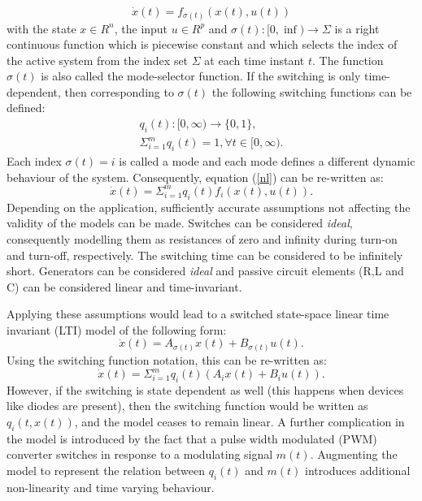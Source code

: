 \documentclass[preprint,12pt]{elsarticle}
\begin{document}
\begin{equation} \label{nl}
\dot{x}(t) = f_{\sigma(t)}(x(t),u(t))
\end{equation}
with the state $x \in R^n$, the input $u \in R^p$ and $\sigma(t) : [0,\inf) \rightarrow \Sigma$ is a right continuous function which is piecewise constant and which selects the index of the active system from the index set $\Sigma$ at each time instant $t$. The function $\sigma(t)$ is also called the mode-selector function. If the switching is only time-dependent, then corresponding to $\sigma(t)$ the following switching functions can be defined:
\begin{eqnarray}
q_i(t) : [0,\infty) \rightarrow \{0, 1\},\\
\Sigma_{i=1}^{m}q_i(t) = 1, \forall t \in [0,\infty).
\end{eqnarray}
Each index $\sigma(t)=i$ is called a mode and each mode defines a different dynamic behaviour of the system. Consequently, equation (\ref{nl}) can be re-written as:
\begin{equation}
\dot{x}(t) = \Sigma_{i=1}^{m}q_i(t)f_i(x(t),u(t)).
\end{equation}
Depending on the application, sufficiently accurate assumptions not affecting the validity of the models can be made. Switches can be considered \textit{ideal}, consequently modelling them as resistances of zero and infinity during turn-on and turn-off, respectively. The switching time can be considered to be infinitely short. Generators can be considered \textit{ideal} and passive circuit elements (R,L and C) can be considered linear and time-invariant.

Applying these assumptions would lead to a switched state-space linear time invariant (LTI) model of the following form:
\begin{equation}
\dot{x}(t) = A_{\sigma(t)}x(t)+B_{\sigma(t)}u(t).
\end{equation}
Using the switching function notation, this can be re-written as:
\begin{equation}
\dot{x}(t) = \Sigma_{i=1}^{m}q_i(t)(A_ix(t)+B_iu(t)).
\end{equation}
However, if the switching is state dependent as well (this happens when devices like diodes are present), then the switching function would be written as $q_i(t, x(t))$, and the model ceases to remain linear. A further complication in the model
is introduced by the fact that a pulse width modulated (PWM) converter switches in response to a modulating signal $m(t)$. Augmenting the model to represent the relation between $q_i(t)$
and $m(t)$ introduces additional non-linearity and time varying behaviour.
\end{document}
